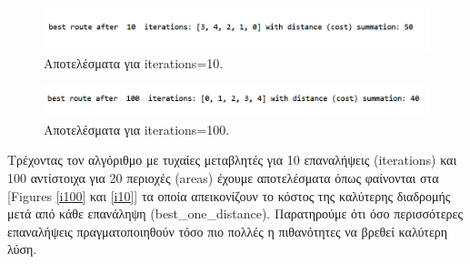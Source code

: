 \begin{figure}
    \centering
    \includegraphics[scale=0.60]{2947_thesis/pictures/ex5.png} 
    \caption{Αποτελέσματα για iterations=10.}
    \label{iter10}
\end{figure}
\begin{figure}
    \centering
    \includegraphics[scale=0.60]{2947_thesis/pictures/ex6.png} 
    \caption{Αποτελέσματα για iterations=100.}
    \label{iter100}
\end{figure}

Τρέχοντας τον αλγόριθμο με τυχαίες μεταβλητές για 10 επαναλήψεις (iterations) και 100 αντίστοιχα για 20 περιοχές (areas) έχουμε αποτελέσματα όπως φαίνονται στα [Figures \ref{i100} και \ref{i10}] τα οποία απεικονίζουν το κόστος της καλύτερης διαδρομής μετά από κάθε επανάληψη (best\_one\_distance). Παρατηρούμε ότι όσο περισσότερες επαναλήψεις πραγματοποιηθούν τόσο πιο πολλές η πιθανότητες να βρεθεί καλύτερη λύση.

